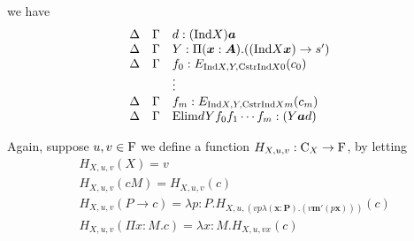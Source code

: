 we have
\[
  \begin{array}{lll}
    \Delta   &\Gamma   & d: (\mathrm{Ind} X) \boldsymbol{a}  \\
    \Delta   &\Gamma   & Y : \Pi (\boldsymbol{x}: \boldsymbol{A}) . ((\mathrm{Ind} X \boldsymbol{x}) \to s') \\
    \Delta   &\Gamma   & f_0 : E_{\mathrm{Ind} X, Y, \mathrm{Cstr} \mathrm{Ind} X 0}(c_0) \\
             &         & \vdots \\
    \Delta   &\Gamma   & f_m : E_{\mathrm{Ind} X, Y, \mathrm{Cstr} \mathrm{Ind} X m}(c_m) \\
    \Delta   &\Gamma   & \mathrm{Elim} d Y f_0 f_1 \cdots f_m : (Y \boldsymbol{a} d)
  \end{array}
\]







Again, suppose $u, v \in \mathrm{F}$ we define a function $H_{X, u, v}: \mathrm{C}_X \to \mathrm{F}$, by letting
\begin{align*}
  & H_{X, u ,v} (X) = v \\
  & H_{X, u ,v} (c M) = H_{X, u ,v} (c) \\
  & H_{X, u ,v} (P \to c) = \lambda p: P . H_{X, u ,(v p \lambda (\bm x : \bm P). (v \bm m' (p \bm x)))}(c) \\
  & H_{X, u ,v} (\Pi x : M. c) = \lambda x : M . H_{X, u ,v x} (c)
\end{align*}




